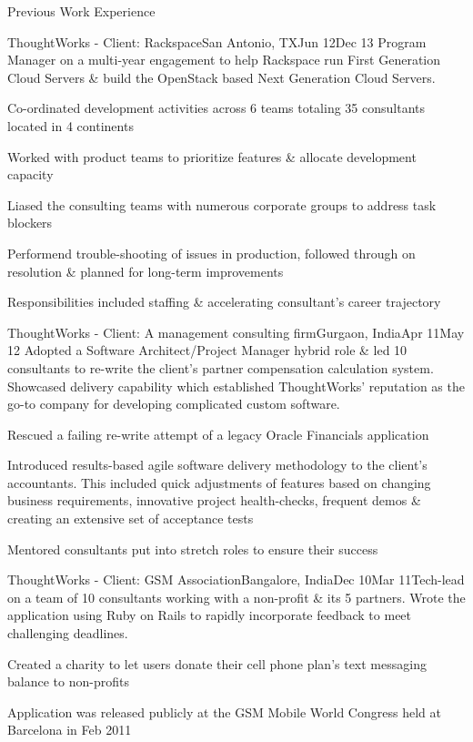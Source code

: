 \documentclass{resume} %
\begin{document}
\begin{rSection}{Previous Work Experience}
\begin{rSubsection}{ThoughtWorks - Client: Rackspace}{San Antonio, TX}{Jun
    12}{Dec 13}
{Program Manager on a multi-year engagement to help Rackspace run
  First Generation Cloud Servers \& build the OpenStack based Next
  Generation Cloud Servers.}

\item Co-ordinated development activities across 6 teams
  totaling 35 consultants located in 4 continents
\item Worked with product teams to prioritize features \& allocate development capacity
\item Liased the consulting teams with numerous corporate groups to address task blockers
\item Performend trouble-shooting of issues in production, followed
  through on resolution \& planned for long-term improvements
\item Responsibilities included staffing \& accelerating consultant's career trajectory
\end{rSubsection}


\begin{rSubsection}{ThoughtWorks - Client: A management consulting
    firm}{Gurgaon, India}{Apr 11}{May 12}
{Adopted a Software Architect/Project Manager hybrid role \& led 10 consultants to re-write the
  client's partner compensation calculation system. Showcased delivery
  capability which established ThoughtWorks' reputation as the go-to company for developing complicated custom software.}

\item Rescued a failing re-write attempt of a legacy Oracle Financials
  application
\item Introduced results-based agile software delivery
  methodology to the client's accountants. This included quick
  adjustments of features based on changing business requirements, innovative
  project health-checks, frequent demos \& creating an extensive set
  of acceptance tests
\item Mentored consultants put into stretch roles to ensure their
  success
\end{rSubsection}


\begin{rSubsection}{ThoughtWorks - Client: GSM Association}{Bangalore, India}{Dec 10}{Mar 11}{Tech-lead on a team of 10 consultants working with a non-profit
  \& its 5 partners. Wrote the application using Ruby on Rails to
  rapidly incorporate feedback to meet challenging deadlines.}
\item Created a charity to let users donate their cell phone plan's text messaging
  balance to non-profits
\item Application was released publicly at the GSM Mobile World Congress held at Barcelona in Feb 2011
\end{rSubsection}



\end{rSection}
\end{document}
